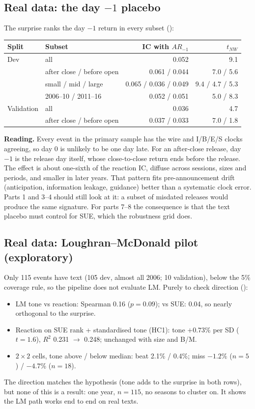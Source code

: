 \documentclass[11pt]{article}
\newcommand{\code}[1]{\path{#1}}
\begin{document}
\subsection{Real data: the day $-1$ placebo}

The surprise ranks the day $-1$ return in every subset (\code{cd_placebo_diagnostic}):

\begin{center}
\begin{tabular}{@{}llrr@{}}
\toprule
Split & Subset & IC with $AR_{-1}$ & $t_{NW}$ \\
\midrule
Dev & all & 0.052 & 9.1 \\
& after close / before open & 0.061 / 0.044 & 7.0 / 5.6 \\
& small / mid / large & 0.065 / 0.036 / 0.049 & 9.4 / 4.7 / 5.3 \\
& 2006--10 / 2011--16 & 0.052 / 0.051 & 5.0 / 8.3 \\
Validation & all & 0.036 & 4.7 \\
& after close / before open & 0.037 / 0.033 & 7.0 / 1.8 \\
\bottomrule
\end{tabular}
\end{center}
\noindent \textbf{Reading.} Every event in the primary sample has the wire and I/B/E/S clocks
agreeing, so day 0 is unlikely to be one day late. For an after-close release, day $-1$ is the
release day itself, whose close-to-close return ends before the release. The effect is about
one-sixth of the reaction IC, diffuse across sessions, sizes and periods, and smaller in later years.
That pattern fits pre-announcement drift (anticipation, information leakage, guidance) better
than a systematic clock error. Parts 1 and 3--4 should still look at it: a subset of misdated
releases would produce the same signature. For parts 7--8 the consequence is that the text placebo
must control for SUE, which the robustness grid does.

\subsection{Real data: Loughran--McDonald pilot (exploratory)}

Only 115 events have text (105 dev, almost all 2006; 10 validation), below the 5\% coverage rule,
so the pipeline does not evaluate LM. Purely to check direction (\code{cd_lm_pilot_*}):

\begin{itemize}
  \item LM tone vs reaction: Spearman 0.16 ($p=0.09$); vs SUE: 0.04, so nearly orthogonal to the surprise.
  \item Reaction on SUE rank + standardised tone (HC1): tone $+0.73$\% per SD ($t=1.6$),
  $R^2$ 0.231 $\to$ 0.248; unchanged with size and B/M.
  \item $2\times2$ cells, tone above / below median: beat 2.1\% / 0.4\%; miss $-1.2$\% ($n=5$) / $-4.7$\% ($n=18$).
\end{itemize}
\noindent The direction matches the hypothesis (tone adds to the surprise in both rows), but none of
this is a result: one year, $n=115$, no seasons to cluster on. It shows the LM path works end to end
on real texts.
\end{document}
